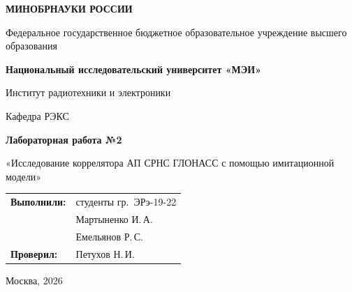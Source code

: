 \begin{titlepage}
    \centering
    {\bfseries МИНОБРНАУКИ РОССИИ\par}
    Федеральное государственное бюджетное образовательное учреждение высшего образования \\
    {\bfseries Национальный исследовательский университет «МЭИ»\par}
    \vspace{1cm}
    Институт радиотехники и электроники\par
    Кафедра РЭКС\par
    \vspace{3cm}
    
    {\bfseries\large Лабораторная работа №2\par}
    \vspace{0.5cm}
    {\large «Исследование коррелятора АП СРНС ГЛОНАСС с помощью имитационной модели»\par}
    
    \vspace{3.5cm}
 \vspace{1.5cm}
\noindent\hfill
\begin{tabular}{@{}ll@{}}
    \textbf{Выполнили:} & студенты гр.~ЭРэ-19-22 \\
                        & Мартыненко И.\,А. \\
                        & Емельянов Р.\,С. \\
    \textbf{Проверил:}  & Петухов Н.\,И.
\end{tabular}   
    \vfill
    {Москва, 2026}
\end{titlepage}
